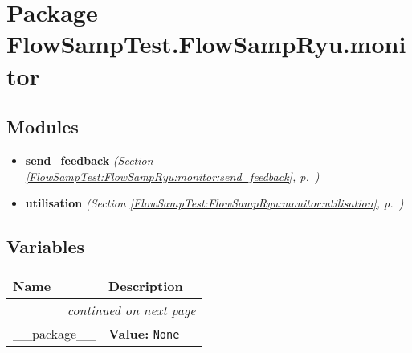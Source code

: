 %
%
%


\section{Package FlowSampTest.FlowSampRyu.monitor}

    \label{FlowSampTest:FlowSampRyu:monitor}


\subsection{Modules}

\begin{itemize}
\setlength{\parskip}{0ex}
\item \textbf{send\_feedback}
  \textit{(Section \ref{FlowSampTest:FlowSampRyu:monitor:send_feedback}, p.~\pageref{FlowSampTest:FlowSampRyu:monitor:send_feedback})}

\item \textbf{utilisation}
  \textit{(Section \ref{FlowSampTest:FlowSampRyu:monitor:utilisation}, p.~\pageref{FlowSampTest:FlowSampRyu:monitor:utilisation})}

\end{itemize}



  \subsection{Variables}

    \vspace{-1cm}
\hspace{\varindent}\begin{longtable}{|p{\varnamewidth}|p{\vardescrwidth}|l}
\cline{1-2}
\cline{1-2} \centering \textbf{Name} & \centering \textbf{Description}& \\
\cline{1-2}
\endhead\cline{1-2}\multicolumn{3}{r}{\small\textit{continued on next page}}\\\endfoot\cline{1-2}
\endlastfoot\raggedright \_\-\_\-p\-a\-c\-k\-a\-g\-e\-\_\-\_\- & \raggedright \textbf{Value:} 
{\tt None}&\\
\cline{1-2}
\end{longtable}

